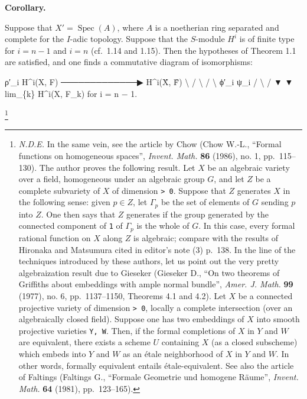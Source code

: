 \documentclass[
]{article}
\newenvironment{Shaded}{}{}
\newcommand{\NormalTok}[1]{#1}
\begin{document}
\textbf{Corollary.}

Suppose that \(X' = \operatorname{Spec}(A)\), where \(A\) is a
noetherian ring separated and complete for the \(I\)-adic topology.
Suppose that the \(S\)-module \(H^{i}\) is of finite type for
\(i = n - 1\) and \(i = n\) (cf.~1.14 and 1.15). Then the hypotheses of
Theorem 1.1 are satisfied, and one finds a commutative diagram of
isomorphisms:

\begin{Shaded}
\begin{Highlighting}[]
\NormalTok{                    ρ′\_i}
\NormalTok{   H\^{}i(X, F)  ─────────────▶  H\^{}i(X̂, F̂)}
\NormalTok{         \textbackslash{}                      /}
\NormalTok{          \textbackslash{}                    /}
\NormalTok{           \textbackslash{} ϕ′\_i         ψ\_i /}
\NormalTok{            \textbackslash{}                /}
\NormalTok{             ▼              ▼}
\NormalTok{              lim\_\{k\} H\^{}i(X, F\_k)              for i = n − 1.}
\end{Highlighting}
\end{Shaded}

\footnote{\emph{N.D.E.} In the same vein, see the article by Chow (Chow
  W.-L., ``Formal functions on homogeneous spaces'', \emph{Invent.
  Math.} \textbf{86} (1986), no. 1, pp.~115--130). The author proves the
  following result. Let \(X\) be an algebraic variety over a field,
  homogeneous under an algebraic group \(G\), and let \(Z\) be a
  complete subvariety of \(X\) of dimension \texttt{\textgreater{}\ 0}.
  Suppose that \(Z\) generates \(X\) in the following sense: given
  \(p \in Z\), let \(\Gamma_{p}\) be the set of elements of \(G\)
  sending \(p\) into \(Z\). One then says that \(Z\) generates if the
  group generated by the connected component of \texttt{1} of
  \(\Gamma_{p}\) is the whole of \(G\). In this case, every formal
  rational function on \(X\) along \(Z\) is algebraic; compare with the
  results of Hironaka and Matsumura cited in editor's note (3) p.~138.
  In the line of the techniques introduced by these authors, let us
  point out the very pretty algebraization result due to Gieseker
  (Gieseker D., ``On two theorems of Griffiths about embeddings with
  ample normal bundle'', \emph{Amer. J. Math.} \textbf{99} (1977), no.
  6, pp.~1137--1150, Theorems 4.1 and 4.2). Let \(X\) be a connected
  projective variety of dimension \texttt{\textgreater{}\ 0}, locally a
  complete intersection (over an algebraically closed field). Suppose
  one has two embeddings of \(X\) into smooth projective varieties
  \texttt{Y,\ W}. Then, if the formal completions of \(X\) in \(Y\) and
  \(W\) are equivalent, there exists a scheme \(U\) containing \(X\) (as
  a closed subscheme) which embeds into \(Y\) and \(W\) as an étale
  neighborhood of \(X\) in \(Y\) and \(W\). In other words, formally
  equivalent entails étale-equivalent. See also the article of Faltings
  (Faltings G., ``Formale Geometrie und homogene Räume'', \emph{Invent.
  Math.} \textbf{64} (1981), pp.~123--165).}
\end{document}
